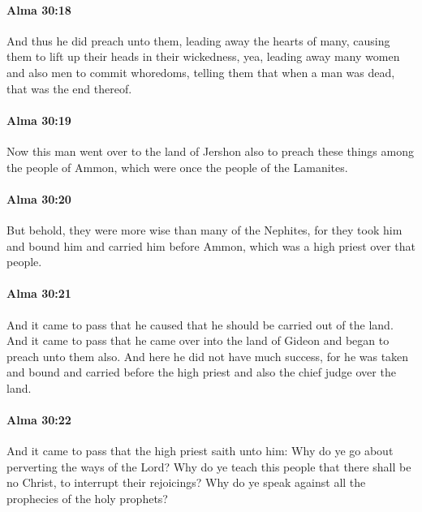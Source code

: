 		\paragraph{Alma 30:18} %
			\label{ALMA-30-18}

			And thus he did preach unto them,
			leading away the hearts of many,
			causing them to lift up their heads in their wickedness,
			yea, leading away many women and also men to commit whoredoms,
			telling them that when a man was dead, that was the end thereof.

		\paragraph{Alma 30:19} %
			\label{ALMA-30-19}

			Now this man went over to the land of Jershon also
			to preach these things among the people of Ammon,
			which were once the people of the Lamanites.

		\paragraph{Alma 30:20} %
			\label{ALMA-30-20}

			But behold, they were more wise than many of the Nephites,
			for they took him and bound him and carried him before Ammon,
			which was a high priest over that people.

		\paragraph{Alma 30:21} %
			\label{ALMA-30-21}

			And it came to pass that he caused that he should be carried out of the land.
			And it came to pass that he came over into the land of Gideon
			and began to preach unto them also.
			And here he did not have much success,
			for he was taken and bound and carried before the high priest
			and also the chief judge over the land.

		\paragraph{Alma 30:22} %
			\label{ALMA-30-22}

			And it came to pass that the high priest saith unto him:
			Why do ye go about perverting the ways of the Lord?
			Why do ye teach this people that there shall be no Christ,
			to interrupt their rejoicings?
			Why do ye speak against all the prophecies of the holy prophets?

